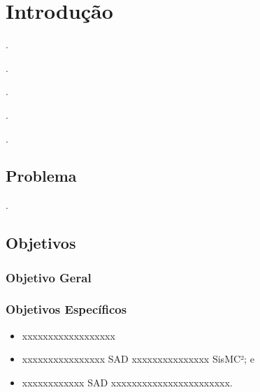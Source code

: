 \chapter{Introdução}

\lipsum[3] \cite{LivroBrancodeDefesaNacional455}.

\lipsum[4] \cite{PoliticaNacionaldeDefesaeEstrategiaNacionaldeDefesa457,LivroBrancodeDefesaNacional455}.

\lipsum[5] \cite{LivroBrancodeDefesaNacional455}.

\lipsum[6] \cite{PoliticaNacionaldeDefesaeEstrategiaNacionaldeDefesa457}.

\lipsum[7] \cite{PoliticaNacionaldeDefesaeEstrategiaNacionaldeDefesa457}.

\lipsum[8-10]

\section{Problema}

\lipsum[11-13] \cite{ConceitoOperacionaldoSistemadeInformacaoedeApoioaDecisaoparaComandoeControle492}.


\section{Objetivos}
\lipsum[14]

\subsection{Objetivo Geral}
\lipsum[15]

\subsection{Objetivos Específicos}
\begin{itemize}
    \item xxxxxxxxxxxxxxxxxx
    \item xxxxxxxxxxxxxxxx \ac{SAD} xxxxxxxxxxxxxxx \ac{SisMC²}; e
    \item xxxxxxxxxxxx \ac{SAD} xxxxxxxxxxxxxxxxxxxxxxx.
\end{itemize}

